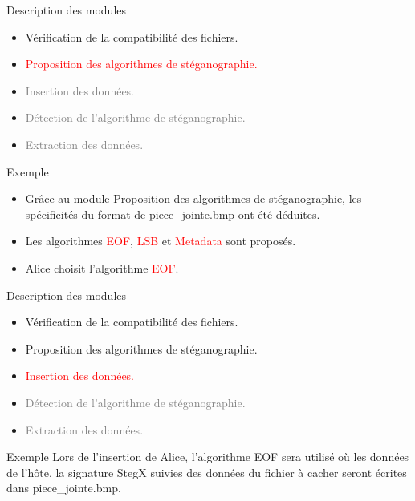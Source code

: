 \documentclass{beamer}
\begin{document}
  \begin{frame} %
	\begin{block}{Description des modules}
	\begin{itemize}
	[circle]
	\item Vérification de la compatibilité des fichiers.
	\item \textcolor{red}{Proposition des algorithmes de stéganographie.}
	\item \textcolor{gray} {Insertion des données.}
	\item \textcolor{gray} {Détection de l'algorithme de stéganographie.}
	\item \textcolor{gray} {Extraction des données.}
	\end{itemize}
	\end{block}
	
	\begin{exampleblock}{Exemple} 
	\begin{itemize}
	[circle]
	\item Grâce au module Proposition des algorithmes de stéganographie, les 
	spécificités du format de piece\_jointe.bmp ont été déduites. 
	\item Les algorithmes \textcolor{red}{EOF}, \textcolor{red}{LSB} et 
	\textcolor{red}{Metadata} sont proposés. 
	\item Alice choisit l'algorithme \textcolor{red}{EOF}. 
	\end{itemize}
	
	\end{exampleblock}
  \end{frame}
  
  \begin{frame} %
	\begin{block}{Description des modules}
	\begin{itemize}
	[circle]
	\item Vérification de la compatibilité des fichiers.
	\item Proposition des algorithmes de stéganographie.
	\item \textcolor{red} {Insertion des données.}
	\item \textcolor{gray} {Détection de l'algorithme de stéganographie.}
	\item \textcolor{gray} {Extraction des données.}
	\end{itemize}
	\end{block}
	
	\begin{exampleblock}{Exemple} 
	Lors de l'insertion de Alice, l'algorithme EOF sera utilisé où 
	les données de l'hôte, la signature StegX suivies des données du fichier 
	à cacher seront écrites dans piece\_jointe.bmp. 
	\end{exampleblock}
  \end{frame}
  
\end{document}
